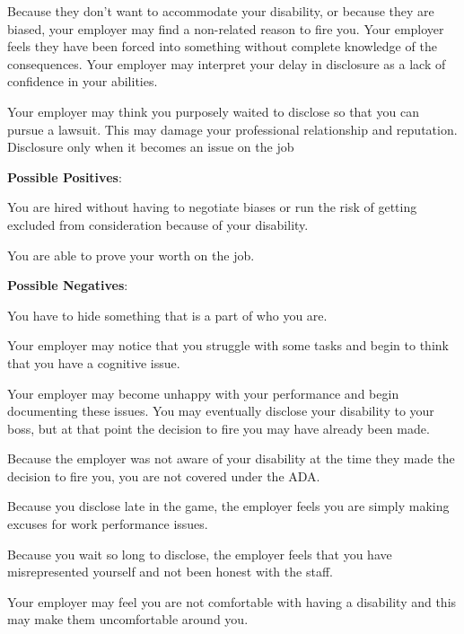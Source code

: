 Because they don't want to accommodate your disability, or because they are biased, your employer may find a non-related reason to fire you.
Your employer feels they have been forced into something without complete knowledge of the consequences. Your employer may interpret your delay in disclosure as a lack of confidence in your abilities.

Your employer may think you purposely waited to disclose so that you can pursue a lawsuit. This may damage your professional relationship and reputation.
Disclosure only when it becomes an issue on the job 

\textbf{Possible Positives}:

You are hired without having to negotiate biases or run the risk of getting excluded from consideration because of your disability.

You are able to prove your worth on the job.
 
\textbf{Possible Negatives}:

You have to hide something that is a part of who you are.

Your employer may notice that you struggle with some tasks and begin to think that you have a cognitive issue.

Your employer may become unhappy with your performance and begin documenting these issues. You may eventually disclose your disability to your boss, but at that point the decision to fire you may have already been made.

Because the employer was not aware of your disability at the time they made the decision to fire you, you are not covered under the ADA.

Because you disclose late in the game, the employer feels you are simply making excuses for work performance issues.

Because you wait so long to disclose, the employer feels that you have misrepresented yourself and not been honest with the staff.

Your employer may feel you are not comfortable with having a disability and this may make them uncomfortable around you.

